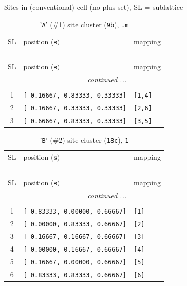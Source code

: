 \documentclass[fleqn,10pt,landscape]{jsarticle}
\begin{document}
\noindent Sites in (conventional) cell (no plus set), SL = sublattice

\renewcommand{\arraystretch}{1.6}
\begin{longtable}[l]{cll}
\captionsetup{justification=raggedright, singlelinecheck=off}
\caption{'\texttt{A}' (\#1) site cluster (\texttt{9b}), \texttt{.m}}
 \\
 \hline \hline
SL & position ($\bm{s})$ & mapping \\ \hline \endfirsthead

\multicolumn{2}{l}{\tablename\ \thetable{}} \\
 \hline \hline
SL & position ($\bm{s})$ & mapping \\ \hline \endhead

 \hline \hline
\multicolumn{2}{r}{\footnotesize\it continued ...} \\ \endfoot

 \hline \hline
\multicolumn{2}{r}{} \\ \endlastfoot

1 & \texttt{[ 0.16667, 0.83333, 0.33333]} & \texttt{[1,4]} \\ \hline
2 & \texttt{[ 0.16667, 0.33333, 0.33333]} & \texttt{[2,6]} \\ \hline
3 & \texttt{[ 0.66667, 0.83333, 0.33333]} & \texttt{[3,5]} \\
\end{longtable}
\renewcommand{\arraystretch}{1.6}
\begin{longtable}[l]{cll}
\captionsetup{justification=raggedright, singlelinecheck=off}
\caption{'\texttt{B}' (\#2) site cluster (\texttt{18c}), \texttt{1}}
 \\
 \hline \hline
SL & position ($\bm{s})$ & mapping \\ \hline \endfirsthead

\multicolumn{2}{l}{\tablename\ \thetable{}} \\
 \hline \hline
SL & position ($\bm{s})$ & mapping \\ \hline \endhead

 \hline \hline
\multicolumn{2}{r}{\footnotesize\it continued ...} \\ \endfoot

 \hline \hline
\multicolumn{2}{r}{} \\ \endlastfoot

1 & \texttt{[ 0.83333, 0.00000, 0.66667]} & \texttt{[1]} \\ \hline
2 & \texttt{[ 0.00000, 0.83333, 0.66667]} & \texttt{[2]} \\ \hline
3 & \texttt{[ 0.16667, 0.16667, 0.66667]} & \texttt{[3]} \\ \hline
4 & \texttt{[ 0.00000, 0.16667, 0.66667]} & \texttt{[4]} \\ \hline
5 & \texttt{[ 0.16667, 0.00000, 0.66667]} & \texttt{[5]} \\ \hline
6 & \texttt{[ 0.83333, 0.83333, 0.66667]} & \texttt{[6]} \\
\end{longtable}
\end{document}
